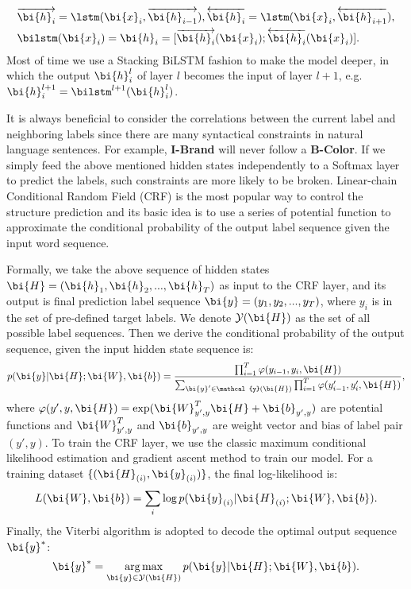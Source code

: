 \begin{eqnarray*}
	& \overrightarrow{\bi{h}_i} = \lstm(\bi{x}_i, \overrightarrow{\bi{h}_{i-1}}),
	 \overleftarrow{\bi{h}_i} = \lstm(\bi{x}_i, \overleftarrow{\bi{h}_{i+1}}), \\
	& \bilstm(\bi{x}_i) = \bi{h}_i = [\overrightarrow{\bi{h}_i}(\bi{x}_i);\overleftarrow{\bi{h}_i}(\bi{x}_i)].
\end{eqnarray*}
Most of time we use a Stacking BiLSTM fashion to make the model deeper,
in which the output $\bi{h}_i^l$ of layer $l$ becomes the input of layer $l+1$,
e.g. $\bi{h}_i^{l+1}=\bilstm^{l+1}(\bi{h}_i^l)$.

It is always beneficial to consider the correlations
between the current label and neighboring
labels since there are many syntactical constraints
in natural language sentences. For example,
\textbf{I-Brand} will never follow a \textbf{B-Color}. 
If we simply feed the above mentioned hidden states
independently to a Softmax layer to predict the labels\cite{hakanni-tur2016multidomain},
such constraints are more likely
to be broken. Linear-chain Conditional Random
Field (CRF) \cite{lafferty2001conditional} 
is the most popular way to control the structure
prediction and its basic idea is to use a series
of potential function to approximate the conditional
probability of the output label sequence
given the input word sequence.

Formally, we take the above sequence of hidden
states $\bi{H} = (\bi{h}_1, \bi{h}_2, ..., \bi{h}_T)$
as input to the CRF layer,
and its output is final prediction label sequence
$\bi{y} = (y_1, y_2, ..., y_T)$,
where $y_i$ is in the set of pre-defined target labels.
We denote $\mathcal{Y}(\bi{H})$ as the set of all possible label sequences.
Then we derive the conditional probability of the output sequence,
given the input hidden state sequence is:
$$
p(\bi{y}|\bi{H};\bi{W}, \bi{b})=\frac{\prod_{i=1}^{T}\varphi(y_{i-1},y_i,\bi{H})}
{\sum_{\bi{y}'\in\mathcal{y}(\bi{H})}\prod_{i=1}^{T}\varphi(y'_{i-1},y'_i,\bi{H})},
$$
where $\varphi(y',y,\bi{H})=\exp(\bi{W}_{y',y}^{T}\bi{H}+\bi{b}_{y',y})$ are potential functions and $\bi{W}_{y',y}^{T}$ and $\bi{b}_{y',y}$ are weight vector and bias of label pair $(y', y)$.
To train the CRF layer, we use the classic maximum
conditional likelihood estimation and gradient ascent method to train our model.
For a training dataset $\{(\bi{H}_{(i)}, \bi{y}_{(i)})\}$, 
the final log-likelihood is:
$$
L(\bi{W},\bi{b}) = \sum_{i}\log p(\bi{y}_{(i)}|\bi{H}_{(i)};\bi{W},\bi{b}).
$$
Finally, the Viterbi algorithm is adopted
to decode the optimal output sequence $\bi{y}^{*}$:
$$
\bi{y}^{*}=\mathop{\arg\max}_{\bi{y}\in\mathcal{Y}(\bi{H})}p(\bi{y}|\bi{H};\bi{W},\bi{b}).
$$